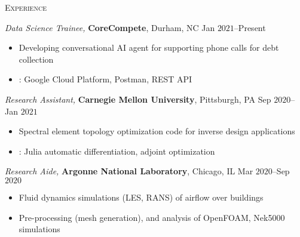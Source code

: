 \documentclass[10pt]{article}
\begin{document}
\begin{multicols}{2}
\textsc{Experience}
\columnbreak

\textit{Data Science Trainee,} \textbf{CoreCompete}, Durham, NC \hfill Jan $2021$--Present

\vspace{-1.75em}
\begin{itemize}[label=-,leftmargin=1.0em]
    \setlength\itemsep{-0.25em}
    \item Developing conversational AI agent for supporting phone calls for debt collection
    \item {}: Google Cloud Platform, Postman, REST API
\end{itemize}
\vspace{-2.0em}

\vspace{0.5em}
%
\textit{Research Assistant,} \textbf{Carnegie Mellon University}, Pittsburgh, PA \hfill Sep $2020$--Jan $2021$

\vspace{-1.75em}
\begin{itemize}[label=-,leftmargin=1.0em]
    \setlength\itemsep{-0.25em}
    \item Spectral element topology optimization code for inverse design applications
    \item {}: Julia automatic differentiation, adjoint optimization
\end{itemize}
\vspace{-2.0em}

\vspace{0.5em}
%
\textit{Research Aide,} \textbf{Argonne National Laboratory}, Chicago, IL \hfill Mar $2020$--Sep $2020$

\vspace{-1.75em}
\begin{itemize}[label=-,leftmargin=1.0em]
    \setlength\itemsep{-0.25em}
    \item Fluid dynamics simulations (LES, RANS) of airflow over buildings
    \item Pre-processing (mesh generation), and analysis of OpenFOAM, Nek5000 simulations
\end{itemize}
\vspace{-2.0em}


\end{multicols}
\end{document}
